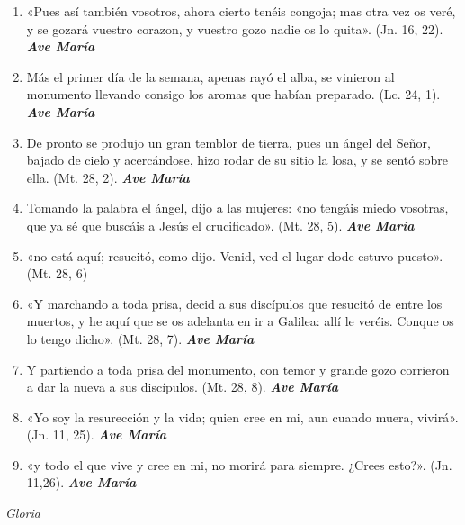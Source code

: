 \documentclass[a4paper,11pt, oneside]{report}
\begin{document}
{{\begin{enumerate}
        \item «Pues así también vosotros, ahora cierto tenéis congoja; mas otra vez os veré, y se gozará vuestro corazon,
        y vuestro gozo nadie os lo quita». (Jn. 16, 22). \textbf{\textit{Ave María}}

        \item Más el primer día de la semana, apenas rayó el alba, se vinieron al monumento llevando consigo los aromas
        que habían preparado. (Lc. 24, 1). \textbf{\textit{Ave María}}

        \item De pronto se produjo un gran temblor de tierra, pues un ángel del Señor, bajado de cielo y acercándose, hizo rodar
        de su sitio la losa, y se sentó sobre ella. (Mt. 28, 2). \textbf{\textit{Ave María}}

        \item Tomando la palabra el ángel, dijo a las mujeres: «no tengáis miedo vosotras, que ya sé que buscáis a Jesús el crucificado». 
        (Mt. 28, 5). \textbf{\textit{Ave María}}

        \item «no está aquí; resucitó, como dijo. Venid, ved el lugar dode estuvo puesto». (Mt. 28, 6)

        \item «Y marchando a toda prisa, decid a sus discípulos que resucitó de entre los muertos, y he aquí que se os adelanta en ir a Galilea:
        allí le veréis. Conque os lo tengo dicho». (Mt. 28, 7). \textbf{\textit{Ave María}}

        \item Y partiendo a toda prisa del monumento, con temor y grande gozo corrieron a dar la nueva a sus discípulos. 
        (Mt. 28, 8). \textbf{\textit{Ave María}}

        \item «Yo soy la resurección y la vida; quien cree en mi, aun cuando muera, vivirá». (Jn. 11, 25). \textbf{\textit{Ave María}}

        \item «y todo el que vive y cree en mi, no morirá para siempre. ¿Crees esto?». (Jn. 11,26). \textbf{\textit{Ave María}}
        
      \end{enumerate}      

      \indent\textit{Gloria} \par      

}}
\end{document}
